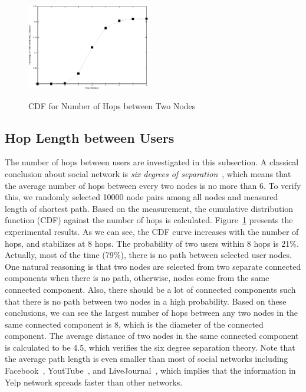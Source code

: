 \documentclass[10pt]{sig-alternate-10pt}   	%
\begin{document}
\begin{figure}[t]
  \centering
  \caption{CDF for Number of Hops between Two Nodes} 
       \includegraphics[width=0.48\textwidth]{figures/hops.eps}
  \label{fig:hops}
\end{figure}

\subsection{Hop Length between Users}
The number of hops between users are investigated in this subsection. A classical conclusion about social network is
\textit{six degrees of separation}~\cite{sixdegree}, which means that the average number of hops between every two nodes 
is no more than 6. To verify this, we randomly selected 10000 node pairs among all nodes and measured length of shortest
path. Based on the measurement, the cumulative distribution function (CDF) against the number of hops is calculated. 
Figure~\ref{fig:hops} 
presents the experimental results. As we can see, the CDF curve increases with the number of hops, and stabilizes 
at 8 hops. The probability of two users within 8 hops is 21\%. Actually, most of the time (79\%), there is no path 
between selected user nodes. One natural reasoning is that two nodes are selected from two separate connected components 
when there is no path, otherwise, nodes come from the same connected component.  Also, there should be a lot of connected 
components such that there is no path between two nodes in a high probability. Based on these conclusions, 
we can see the largest number of  hops between any two nodes in the same connected component is 8, 
which is the diameter of the connected component. The average distance of two nodes in the same connected 
component is calculated to be 4.5, which verifies the six degree separation theory. Note that the average path 
length is even smaller than most of social networks including Facebook~\cite{facebook}, YoutTube~\cite{imc2007}, 
and LiveJournal~\cite{imc2007}, which implies that the information in Yelp network spreads faster than other networks.
   
\end{document}
